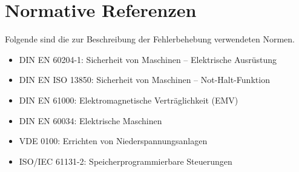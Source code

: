 \section*{Normative Referenzen}
Folgende sind die zur Beschreibung der Fehlerbehebung verwendeten Normen.
\begin{itemize}
	\item DIN EN 60204-1: Sicherheit von Maschinen – Elektrische Ausrüstung
	\item DIN EN ISO 13850: Sicherheit von Maschinen – Not-Halt-Funktion
	\item DIN EN 61000: Elektromagnetische Verträglichkeit (EMV)
	\item DIN EN 60034: Elektrische Maschinen
	\item VDE 0100: Errichten von Niederspannungsanlagen
	\item ISO/IEC 61131-2: Speicherprogrammierbare Steuerungen
\end{itemize}







